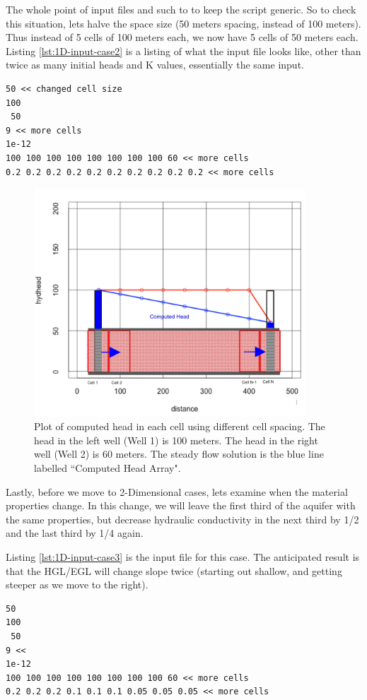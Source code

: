 The whole point of input files and such to to keep the script generic.  
So to check this situation, lets halve the space size (50 meters spacing, instead of 100 meters).
Thus instead of 5 cells of 100 meters each, we now have 5 cells of 50 meters each.
Listing \ref{lst:1D-input-case2} is a listing of what the input file looks like, other than twice as many initial heads and K values, essentially the same input.
\begin{lstlisting}[caption= Input File for Example Problem \\ , label=lst:1D-input-case2]
50 << changed cell size
100
 50
9 << more cells
1e-12
100 100 100 100 100 100 100 100 60 << more cells
0.2 0.2 0.2 0.2 0.2 0.2 0.2 0.2 0.2 0.2 << more cells
\end{lstlisting}

\begin{figure}[h!] %
   \centering
   \includegraphics[width=4in]{./17-SteadyGroundwaterFlow/aquifer-1d-solution-case2.jpg} 
   \caption{Plot of computed head in each cell using different cell spacing.   The head in the left well (Well 1) is 100 meters.   The head in the right well (Well 2) is 60 meters.  The steady flow solution is the blue line labelled ``Computed Head Array".}
   \label{fig:aquifer-1d-solution-case2}
\end{figure}

Lastly, before we move to 2-Dimensional cases, lets examine when the material properties change.  
In this change, we will leave the first third of the aquifer with the same properties, but decrease hydraulic conductivity in the next third by 1/2 and the last third by 1/4 again.

Listing \ref{lst:1D-input-case3} is the input file for this case.  The anticipated result is that the HGL/EGL will change slope twice (starting out shallow, and getting steeper as we move to the right).
\clearpage
\begin{lstlisting}[caption= Input File for Example Problem \\ , label=lst:1D-input-case3]
50 
100
 50
9 << 
1e-12
100 100 100 100 100 100 100 100 60 << more cells
0.2 0.2 0.2 0.1 0.1 0.1 0.05 0.05 0.05 << more cells
\end{lstlisting}

